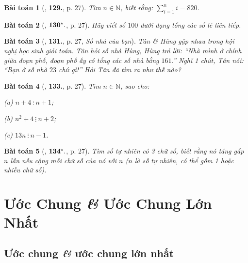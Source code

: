 \documentclass[oneside]{book}
\numberwithin{equation}{section}
\newtheorem{baitoan}{Bài toán}[section]
\begin{document}
\begin{baitoan}[\cite{Binh_Toan_6_tap_1}, \textbf{129.}, p. 27]
	Tìm $n\in\mathbb{N}$, biết rằng: $\sum_{i=1}^n i = 820$.
\end{baitoan}

\begin{baitoan}[\cite{Binh_Toan_6_tap_1}, $\bf 130^\star.$, p. 27]
	Hãy viết số $100$ dưới dạng tổng các số lẻ liên tiếp.
\end{baitoan}

\begin{baitoan}[\cite{Binh_Toan_6_tap_1}, \textbf{131.}, p. 27, \textit{Số nhà của bạn}]
	Tân \& Hùng gặp nhau trong hội nghị học sinh giỏi toán. Tân hỏi số nhà Hùng, Hùng trả lời: ``Nhà mình ở chính giữa đoạn phố, đoạn phố ấy có tổng các số nhà bằng $161$.'' Nghĩ 1 chút, Tân nói: ``Bạn ở số nhà $23$ chứ gì!'' Hỏi Tân đã tìm ra như thế nào?
\end{baitoan}

\begin{baitoan}[\cite{Binh_Toan_6_tap_1}, \textbf{133.}, p. 27]
	Tìm $n\in\mathbb{N}$, sao cho:
	\begin{enumerate*}
		\item[(a)] $n + 4\ \vdots\ n + 1$;
		\item[(b)] $n^2 + 4\ \vdots\ n + 2$;
		\item[(c)] $13n\ \vdots\ n - 1$.
	\end{enumerate*}
\end{baitoan}

\begin{baitoan}[\cite{Binh_Toan_6_tap_1}, $\bf 134^\star.$, p. 27]
	Tìm số tự nhiên có 3 chữ số, biết rằng nó tăng gấp $n$ lần nếu cộng mỗi chữ số của nó với $n$ ($n$ là số tự nhiên, có thể gồm 1 hoặc nhiều chữ số).
\end{baitoan}


\section{Ước Chung \textit{\&} Ước Chung Lớn Nhất}

\subsection{Ước chung \textit{\&} ước chung lớn nhất}
\end{document}
